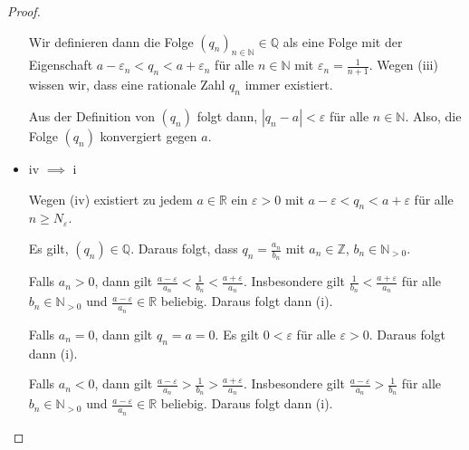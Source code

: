 \documentclass[12pt]{extarticle}
\begin{document}
\begin{proof}
\begin{itemize}
    Wir definieren dann die Folge
    \((q_n)_{n\in\mathbb{N}}\in \mathbb{Q}\) als eine Folge mit der
    Eigenschaft \(a-\varepsilon_n < q_n < a+\varepsilon_n\) für alle
    \(n \in \mathbb{N}\) mit \(\varepsilon_n = \frac{1}{n+1}\).  Wegen
    (iii) wissen wir, dass eine rationale Zahl \(q_n\) immer existiert.

    Aus der Definition von \((q_n)\) folgt dann,
    \(\left| q_n - a \right| < \varepsilon\) für alle
    \(n \in \mathbb{N}\).  Also, die Folge \((q_n)\) konvergiert gegen
    \(a\).
  \item iv \(\implies\) i

    Wegen (iv) existiert zu jedem \(a \in \mathbb{R}\) ein
    \(\varepsilon > 0\) mit \(a - \varepsilon < q_n < a + \varepsilon\)
    für alle \(n \geq N_{\varepsilon}\).

    Es gilt, \((q_n) \in \mathbb{Q}\).  Daraus folgt, dass
    \(q_n=\frac{a_n}{b_n}\) mit \(a_n \in \mathbb{Z}\), $b_n \in
    \mathbb{N}_{>0}$.

    Falls \(a_n > 0\), dann gilt
    $\frac{a-\varepsilon}{a_n}< \frac{1}{b_n} <
    \frac{a+\varepsilon}{a_n}$.  Insbesondere gilt
    \(\frac{1}{b_n} < \frac{a+\varepsilon}{a_n}\) für alle
    \(b_n \in \mathbb{N}_{>0}\) und
    \(\frac{a-\varepsilon}{a_n} \in \mathbb{R}\) beliebig.  Daraus folgt
    dann (i).

    Falls \(a_n=0\), dann gilt \(q_n=a=0\).  Es gilt \(0 < \varepsilon\)
    für alle \(\varepsilon > 0\).  Daraus folgt dann (i).

    Falls \(a_n < 0\), dann gilt
    $\frac{a-\varepsilon}{a_n}> \frac{1}{b_n} >
    \frac{a+\varepsilon}{a_n}$.  Insbesondere gilt
    \(\frac{a-\varepsilon}{a_n}> \frac{1}{b_n}\) für alle
    \(b_n \in \mathbb{N}_{>0}\) und
    \(\frac{a-\varepsilon}{a_n} \in \mathbb{R}\) beliebig.  Daraus folgt
    dann (i).
  \end{itemize}
\end{proof}
\end{document}
